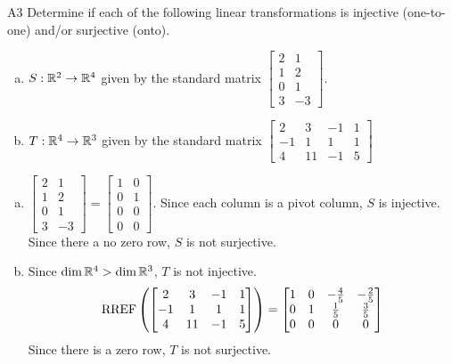 \begin{problem}{A3}
Determine if each of the following linear transformations is injective (one-to-one) and/or surjective (onto).
\begin{enumerate}[(a)]
\item $S: \mathbb{R}^2 \rightarrow \mathbb{R}^4$ given by the standard matrix $\begin{bmatrix} 2 & 1 \\ 1 & 2 \\ 0 & 1 \\ 3 & -3 \end{bmatrix}$.
\item $T: \mathbb{R}^4 \rightarrow \mathbb{R}^3$ given by the standard matrix $\begin{bmatrix} 2 & 3 & -1 & 1 \\ -1 & 1 & 1 & 1 \\ 4 & 11 & -1 & 5 \end{bmatrix}$
\end{enumerate}
\end{problem}
\begin{solution}
\begin{enumerate}[(a)]
\item $ \begin{bmatrix} 2 & 1 \\ 1 & 2 \\ 0 & 1 \\ 3 & -3 \end{bmatrix}=\begin{bmatrix}1 & 0 \\ 0 & 1 \\ 0 & 0 \\ 0 & 0  \end{bmatrix}$.  Since each column is a pivot column, $S$ is injective.  Since there a no zero row, $S$ is not surjective.
\item Since $\dim \mathbb{R}^4 > \dim \mathbb{R}^3$, $T$ is not injective.
$$\operatorname{RREF}\left(\begin{bmatrix} 2 & 3 & -1 & 1 \\ -1 & 1 & 1 & 1 \\ 4 & 11 & -1 & 5 \end{bmatrix}\right) = \begin{bmatrix} 1 & 0  & -\frac{4}{5} & -\frac{2}{5} \\ 0 & 1 & \frac{1}{5} & \frac{3}{5} \\ 0 & 0 & 0 & 0 \end{bmatrix}$$
Since there is a zero row, $T$ is not surjective.
\end{enumerate}
\end{solution}

